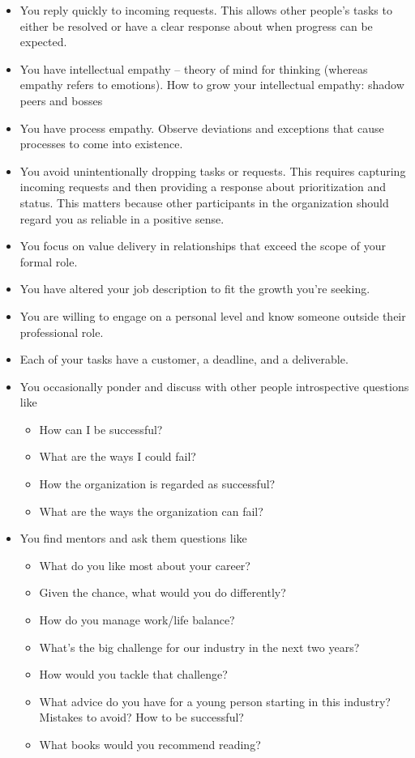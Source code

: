 \begin{itemize}
    \item You reply quickly to incoming requests. This allows other people's tasks to either be resolved or have a clear response about when progress can be expected. 
    \item You have intellectual empathy -- theory of mind for thinking (whereas empathy refers to emotions). How to grow your intellectual empathy: shadow peers and bosses
    \item You have process empathy. Observe deviations and exceptions that cause processes to come into existence. 
    \item You avoid unintentionally dropping tasks or requests. This requires capturing incoming requests and then providing a response about prioritization and status. This matters because other participants in the organization should regard you as reliable in a positive sense. 
    \item You focus on value delivery in relationships that exceed the scope of your formal role.
\item You have altered your job description to fit the growth you're seeking.
\item You are willing to engage on a personal level and know someone outside their professional role.
\item Each of your tasks have a customer, a deadline, and a deliverable.
\item You occasionally ponder and discuss with other people introspective questions like
\begin{itemize}
    \item How can I be successful?
    \item What are the ways I could fail?
    \item How the organization is regarded as successful?
    \item What are the ways the organization can fail?
\end{itemize}
\item You find mentors and ask them questions like
\begin{itemize}
    \item What do you like most about your career? 
    \item Given the chance, what would you do differently?
    \item How do you manage work/life balance?
    \item What's the big challenge for our industry in the next two years?
    \item How would you tackle that challenge?
    \item What advice do you have for a young person starting in this industry? Mistakes to avoid?  How to be successful?
    \item What books would you recommend reading?
\end{itemize}
\end{itemize}


